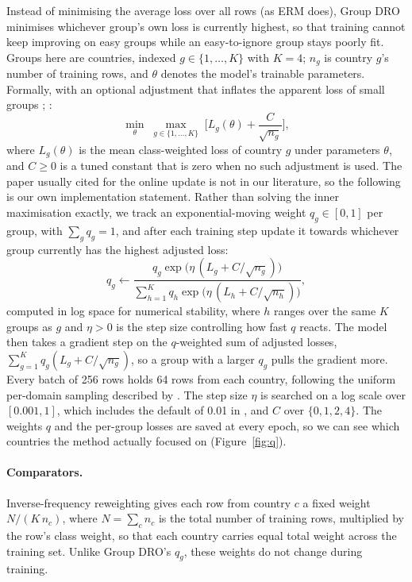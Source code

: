 \documentclass[11pt]{article}
\begin{document}
Instead of minimising the average loss over all rows (as ERM does), Group DRO minimises whichever group's own loss is currently highest, so that training cannot keep improving on easy groups while an easy-to-ignore group stays poorly fit. Groups here are countries, indexed $g \in \{1, \dots, K\}$ with $K=4$; $n_g$ is country $g$'s number of training rows, and $\theta$ denotes the model's trainable parameters. Formally, with an optional adjustment that inflates the apparent loss of small groups \citep[pp.~2--3]{ghosal2023distributionally}; \citep[Eq.~4]{stahlschmidt2024domain}:
\begin{equation}
  \min_\theta \; \max_{g \in \{1,\dots,K\}} \; \Big[ L_g(\theta) + \frac{C}{\sqrt{n_g}} \Big],
\end{equation}
where $L_g(\theta)$ is the mean class-weighted loss of country $g$ under parameters $\theta$, and $C \geq 0$ is a tuned constant that is zero when no such adjustment is used. The paper usually cited for the online update is not in our literature, so the following is our own implementation statement. Rather than solving the inner maximisation exactly, we track an exponential-moving weight $q_g \in [0,1]$ per group, with $\sum_g q_g = 1$, and after each training step update it towards whichever group currently has the highest adjusted loss:
\begin{equation}
  q_g \leftarrow \frac{q_g \exp\!\big(\eta\,(L_g + C/\sqrt{n_g})\big)}{\sum_{h=1}^{K} q_h \exp\!\big(\eta\,(L_h + C/\sqrt{n_h})\big)},
\end{equation}
computed in log space for numerical stability, where $h$ ranges over the same $K$ groups as $g$ and $\eta > 0$ is the step size controlling how fast $q$ reacts. The model then takes a gradient step on the $q$-weighted sum of adjusted losses, $\sum_{g=1}^{K} q_g (L_g + C/\sqrt{n_g})$, so a group with a larger $q_g$ pulls the gradient more. Every batch of 256 rows holds 64 rows from each country, following the uniform per-domain sampling described by \citet[p.~66]{koh2021wilds}. The step size $\eta$ is searched on a log scale over $[0.001, 1]$, which includes the default of 0.01 in \citet[p.~66]{koh2021wilds}, and $C$ over $\{0, 1, 2, 4\}$. The weights $q$ and the per-group losses are saved at every epoch, so we can see which countries the method actually focused on (Figure~\ref{fig:q}).

\paragraph{Comparators.} Inverse-frequency reweighting gives each row from country $c$ a fixed weight $N / (K\, n_{c})$, where $N = \sum_c n_c$ is the total number of training rows, multiplied by the row's class weight, so that each country carries equal total weight across the training set. Unlike Group DRO's $q_g$, these weights do not change during training.
\end{document}
